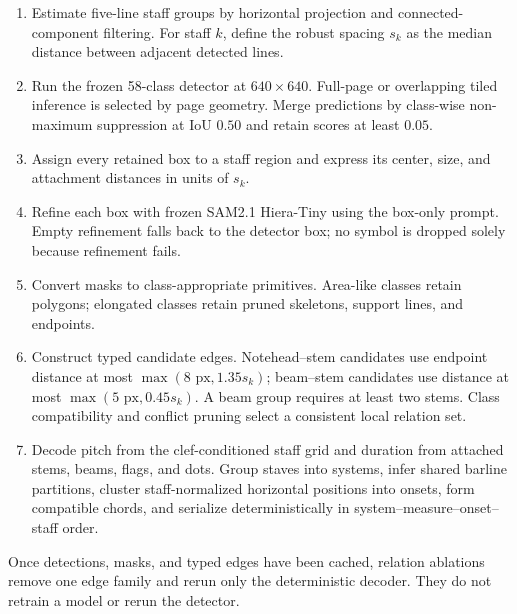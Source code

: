 \documentclass[letterpaper]{article}
\begin{document}
\begin{enumerate}[leftmargin=1.6em]
  \item Estimate five-line staff groups by horizontal projection and connected-component filtering. For staff $k$, define the robust spacing $s_k$ as the median distance between adjacent detected lines.
  \item Run the frozen 58-class detector at $640\!\times\!640$. Full-page or overlapping tiled inference is selected by page geometry. Merge predictions by class-wise non-maximum suppression at IoU $0.50$ and retain scores at least $0.05$.
  \item Assign every retained box to a staff region and express its center, size, and attachment distances in units of $s_k$.
  \item Refine each box with frozen SAM2.1 Hiera-Tiny using the box-only prompt. Empty refinement falls back to the detector box; no symbol is dropped solely because refinement fails.
  \item Convert masks to class-appropriate primitives. Area-like classes retain polygons; elongated classes retain pruned skeletons, support lines, and endpoints.
  \item Construct typed candidate edges. Notehead--stem candidates use endpoint distance at most $\max(8\text{ px},1.35s_k)$; beam--stem candidates use distance at most $\max(5\text{ px},0.45s_k)$. A beam group requires at least two stems. Class compatibility and conflict pruning select a consistent local relation set.
  \item Decode pitch from the clef-conditioned staff grid and duration from attached stems, beams, flags, and dots. Group staves into systems, infer shared barline partitions, cluster staff-normalized horizontal positions into onsets, form compatible chords, and serialize deterministically in system--measure--onset--staff order.
\end{enumerate}

Once detections, masks, and typed edges have been cached, relation ablations remove one edge family and rerun only the deterministic decoder. They do not retrain a model or rerun the detector.
\end{document}
